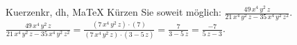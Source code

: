 \begin{MAufgabe}{Kuerzen}{kr, dh, MaTeX}
K\"urzen Sie soweit m\"oglich: $\frac{49\, x^4\, y^2\, z}{21\, x^4\, y^2\, z - 35\, x^4\, y^2\, z^2}$.\\ 
\ifLsg\MLoesung
\quad $\frac{49\, x^4\, y^2\, z}{21\, x^4\, y^2\, z - 35\, x^4\, y^2\, z^2}=\frac{(7\, x^4\, y^2\, z)\cdot(7)}{(7\, x^4\, y^2\, z)\cdot(3 - 5\, z)}=\frac{7}{3 - 5\, z}=\frac{-7}{5\, z - 3}$.\else\relax\fi
 \end{MAufgabe}